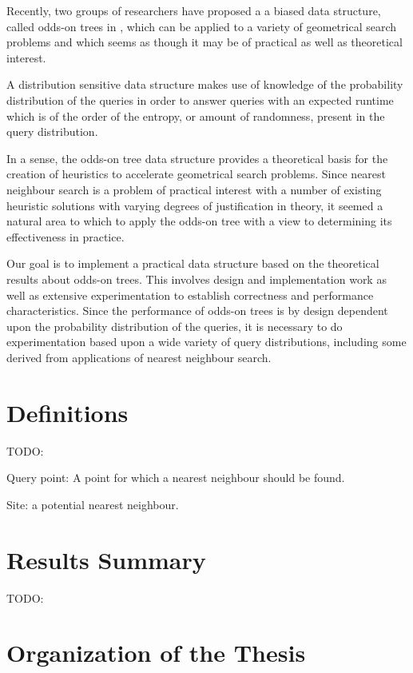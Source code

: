 \documentclass[mcs]{scsthesis}
\begin{document}
Recently, two groups of researchers \cite{chan} \cite{oddson} have proposed a
a biased data structure, called odds-on trees in \cite{oddson},  which can be
applied to a variety of geometrical search problems and which seems as though it
may be of practical as well as theoretical interest.

A distribution sensitive data structure makes use of knowledge of the
probability distribution of the queries in order to answer queries with an
expected runtime which is of the order of the entropy, or amount of randomness,
present in the query distribution. 

In a sense, the odds-on tree data structure provides a theoretical basis for
the creation of heuristics to accelerate geometrical search problems. Since
nearest neighbour search is a problem of practical interest with a number of
existing heuristic solutions with varying degrees of justification in theory,
it seemed a natural area to which to apply the odds-on tree with a view to
determining its effectiveness in practice.

Our goal is to implement a practical data structure based on the theoretical
results about odds-on trees.  This involves design and implementation work as
well as extensive experimentation to establish correctness and performance
characteristics.  Since the performance of odds-on trees is by design
dependent upon the probability distribution of the queries, it is necessary
to do experimentation based upon a wide variety of query distributions,
including some derived from applications of nearest neighbour search.

\section{Definitions}

TODO:

Query point: A point for which a nearest neighbour should be found. 

Site: a potential nearest neighbour.

\section{Results Summary}

TODO:

\section{Organization of the Thesis}
\end{document}
